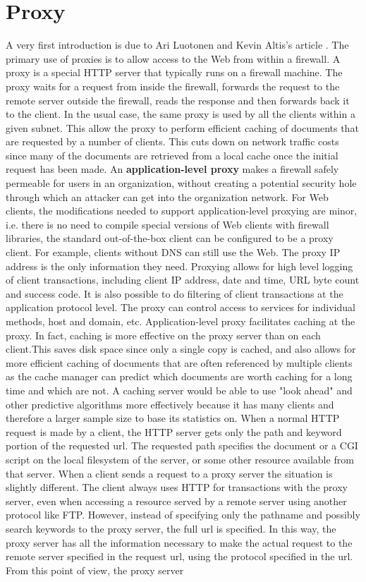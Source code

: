 \documentclass[11pt]{article}
\begin{document}
\section{Proxy}
A very first introduction is due to Ari Luotonen and Kevin Altis's article \cite{www_proxies}. The primary use of proxies is to allow access to the Web from within a firewall. A proxy is a special HTTP server that typically runs on a firewall machine. The proxy waits for a request from inside the firewall, forwards the request to the remote server outside the firewall, reads the response and then forwards back it to the client. In the usual case, the same proxy is used by all the clients within a given subnet. This allow the proxy to perform efficient caching of documents that are requested by a number of clients. This cuts down on network traffic costs since many of the documents are retrieved from a local cache once the initial request has been made. An \textbf{application-level proxy} makes a firewall safely permeable for users in an organization, without creating a potential security hole through which an attacker can get into the organization network. For Web clients, the modifications needed to support application-level proxying are minor, i.e. there is no need to compile special versions of Web clients with firewall libraries, the standard out-of-the-box client can be configured to be a proxy client. For example, clients without DNS can still use the Web. The proxy IP address is the only information they need. Proxying allows for high level logging of client transactions, including client IP address, date and time, URL byte count and success code. It is also possible to do filtering of client transactions at the application protocol level. The proxy can control access to services for individual methods, host and domain, etc. Application-level proxy facilitates caching at the proxy. In fact, caching is more effective on the proxy server than on each client.This saves disk space since only a single copy is cached, and also allows for more efficient caching of documents that are often referenced by multiple clients as the cache manager can predict which documents are worth caching for a long time and which are not. A caching server would be able to use "look ahead" and other predictive algorithms more effectively because it has many clients and therefore a larger sample size to base its statistics on. When a normal HTTP request is made by a client, the HTTP server gets only the path and keyword portion of the requested url. The requested path specifies the document or a CGI script on the local filesystem of the server, or some other resource available from that server. When a client sends a request to a proxy server the situation is slightly different. The client always uses HTTP for transactions with the proxy server, even when accessing a resource served by a remote server using another protocol like FTP. However, instead of specifying only the pathname and possibly search keywords to the proxy server, the full url is specified. In this way, the proxy server has all the information necessary to make the actual request to the remote server specified in the request url, using the protocol specified in the url. From this point of view, the proxy server 
\end{document}
